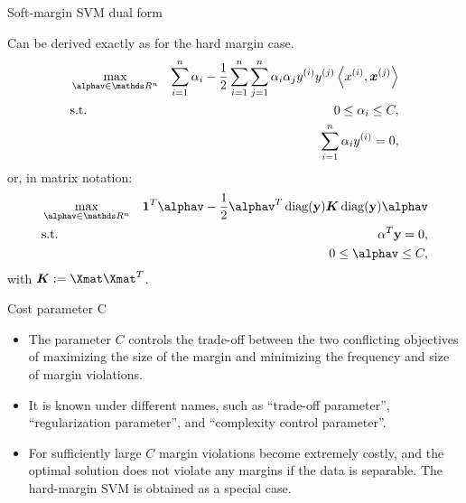 \begin{vbframe}{Soft-margin SVM dual form}

Can be derived exactly as for the hard margin case.
\begin{eqnarray*}
    & \max\limits_{\alphav \in \R^n} & \sum_{i=1}^n \alpha_i - \frac{1}{2}\sum_{i=1}^n\sum_{j=1}^n\alpha_i\alpha_j\yi y^{(j)} \scp{\xi}{\xv^{(j)}} \\
    & \text{s.t. } & 0 \le \alpha_i \le C, \\
    & \quad & \sum_{i=1}^n \alpha_i \yi = 0,
\end{eqnarray*}
or, in matrix notation:
\begin{eqnarray*}
  & \max\limits_{\alphav \in \R^n} &  \one^T \alphav - \frac{1}{2} \alphav^T \diag(\ydat) \bm{K} \diag(\ydat) \alphav \\
  & \text{s.t.} & \alpha^T \ydat = 0, \\
  &  & 0 \leq \alphav \leq C,
\end{eqnarray*}
with $\bm{K}:=\Xmat \Xmat^T$.
\end{vbframe}

\begin{vbframe}{Cost parameter C}

  \begin{itemize}
    \item The parameter $C$ controls the trade-off between the two conflicting
    objectives of maximizing the size of the margin and minimizing the frequency and size of margin
    violations.
    \item It is known under different names, such as \enquote{trade-off parameter}, \enquote{regularization parameter},
    and \enquote{complexity control parameter}.
    \item   For sufficiently large $C$ margin violations become extremely costly,
  and the optimal solution does not violate any margins if the
  data is separable. The hard-margin SVM is obtained as a special case.
  \end{itemize}
\end{vbframe}


